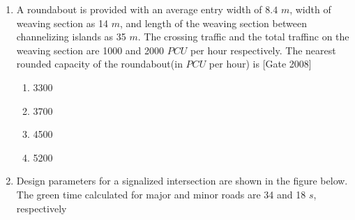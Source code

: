\documentclass[journal]{IEEEtran}
\begin{document}
\begin{enumerate}
\begin{center}
\begin{tabular}{|l|l|}
\end{tabular}
\end{center}
\begin{multicols}{2}
	\begin{enumerate}
		\item P-4,Q-3,R-1,S-2
		\item P-4,Q-3,R-2,S-1
		\item P-3,Q-4,R-2,S-1
		\item P-1,Q-2,R-3,S-4
	\end{enumerate}
\end{multicols}


	\item A roundabout is provided with an average entry width of $8.4$ $m$, width of weaving section as 14 $m$, and length of the weaving section between channelizing islands as 35 $m$. The crossing traffic and the total traffinc on the weaving section are 1000 and 2000 $PCU$ per hour respectively. The nearest rounded capacity of the roundabout(in $PCU$ per hour) is \hfill [Gate 2008]
\begin{multicols}{4}
	\begin{enumerate}
		\item 3300
		\item 3700
		\item 4500
		\item 5200
	\end{enumerate}
\end{multicols}	
	\item Design parameters for a signalized intersection are shown in the figure below. The green time calculated for major and minor roads are 34 and 18 $s$, respectively 
		\begin{figure}[h]
\centering
{}
\end{figure}
\end{enumerate}
\end{document}
